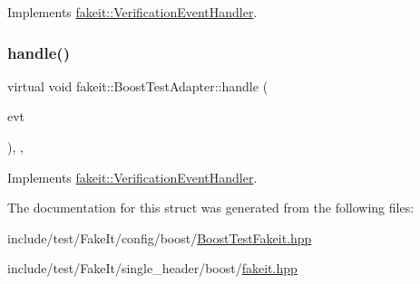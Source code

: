 Implements \mbox{\hyperlink{structfakeit_1_1VerificationEventHandler_adf355a9888bc2bf78ce0e1219bfb1379}{fakeit\+::\+Verification\+Event\+Handler}}.

\mbox{\label{structfakeit_1_1BoostTestAdapter_aef1bc4f059166c4e403bdb1d31b68fc5}} 
\subsubsection{\texorpdfstring{handle()}{handle()}\hspace{0.1cm}{\footnotesize\ttfamily [6/6]}}
{\footnotesize\ttfamily virtual void fakeit\+::\+Boost\+Test\+Adapter\+::handle (\begin{DoxyParamCaption}\item[{const \mbox{\hyperlink{structfakeit_1_1NoMoreInvocationsVerificationEvent}{No\+More\+Invocations\+Verification\+Event}} \&}]{evt }\end{DoxyParamCaption})\hspace{0.3cm}{\ttfamily [inline]}, {\ttfamily [override]}, {\ttfamily [virtual]}}



Implements \mbox{\hyperlink{structfakeit_1_1VerificationEventHandler_a826b9d15e23bad7013b219d8e45ef1d0}{fakeit\+::\+Verification\+Event\+Handler}}.



The documentation for this struct was generated from the following files\+:\begin{DoxyCompactItemize}
\item 
include/test/\+Fake\+It/config/boost/\mbox{\hyperlink{BoostTestFakeit_8hpp}{Boost\+Test\+Fakeit.\+hpp}}\item 
include/test/\+Fake\+It/single\+\_\+header/boost/\mbox{\hyperlink{single__header_2boost_2fakeit_8hpp}{fakeit.\+hpp}}\end{DoxyCompactItemize}
